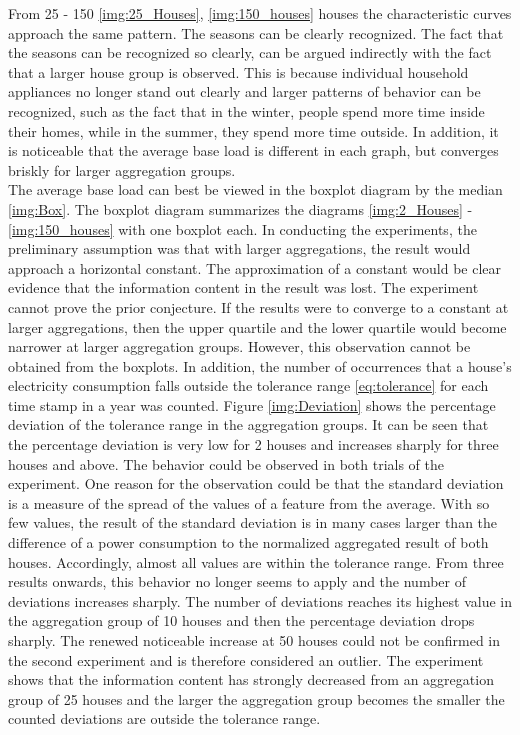 From 25 - 150 \ref{img:25_Houses}, \ref{img:150_houses} houses the characteristic curves approach the same pattern. The seasons can be clearly recognized. The fact that the seasons can be recognized so clearly, can be argued indirectly with the fact that a larger house group is observed. This is because individual household appliances no longer stand out clearly and larger patterns of behavior can be recognized, such as the fact that in the winter, people spend more time inside their homes, while in the summer, they spend more time outside. In addition, it is noticeable that the average base load is different in each graph, but converges briskly for larger aggregation groups. \\
The average base load can best be viewed in the boxplot diagram by the median \ref{img:Box}. The boxplot diagram summarizes the diagrams \ref{img:2_Houses} - \ref{img:150_houses} with one boxplot each. In conducting the experiments, the preliminary assumption was that with larger aggregations, the result would approach a horizontal constant. The approximation of a constant would be clear evidence that the information content in the result was lost. The experiment cannot prove the prior conjecture. If the results were to converge to a constant at larger aggregations, then the upper quartile and the lower quartile would become narrower at larger aggregation groups. However, this observation cannot be obtained from the boxplots. 
In addition, the number of occurrences that a house's electricity consumption falls outside the tolerance range \ref{eq:tolerance} for each time stamp in a year was counted. Figure \ref{img:Deviation} shows the percentage deviation of the tolerance range in the aggregation groups. It can be seen that the percentage deviation is very low for 2 houses and increases sharply for three houses and above. The behavior could be observed in both trials of the experiment. One reason for the observation could be that the standard deviation is a measure of the spread of the values of a feature from the average. With so few values, the result of the standard deviation is in many cases larger than the difference of a power consumption to the normalized aggregated result of both houses. Accordingly, almost all values are within the tolerance range. From three results onwards, this behavior no longer seems to apply and the number of deviations increases sharply. The number of deviations reaches its highest value in the aggregation group of 10 houses and then the percentage deviation drops sharply. The renewed noticeable increase at 50 houses could not be confirmed in the second experiment and is therefore considered an outlier. The experiment shows that the information content has strongly decreased from an aggregation group of 25 houses and the larger the aggregation group becomes the smaller the counted deviations are outside the tolerance range.
